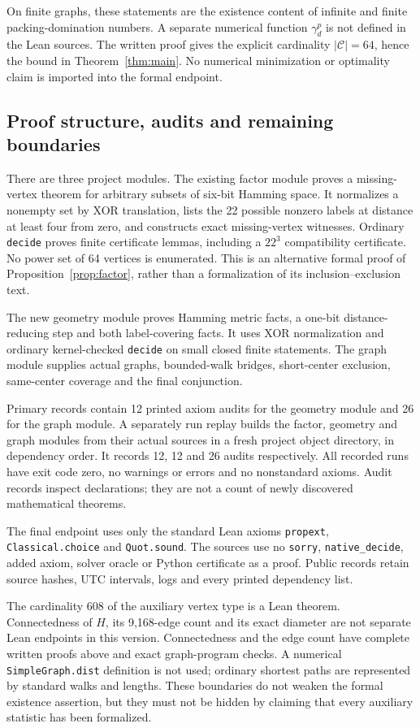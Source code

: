 \documentclass[11pt]{article}
\theoremstyle{definition}
\theoremstyle{remark}
\newcommand{\code}{\mathcal C}
\begin{document}
On finite graphs, these statements are the existence content
of infinite and finite packing-domination numbers. A separate
numerical function \(\gamma_d^p\) is not defined in the Lean
sources. The written proof gives the explicit cardinality
\(|\code|=64\), hence the bound in Theorem~\ref{thm:main}.
No numerical minimization or optimality claim is imported
into the formal endpoint.

\subsection{Proof structure, audits and remaining boundaries}
There are three project modules. The existing factor module
proves a missing-vertex theorem for arbitrary subsets of
six-bit Hamming space. It normalizes a nonempty set by XOR
translation, lists the 22 possible nonzero labels at distance
at least four from zero, and constructs exact missing-vertex
witnesses. Ordinary \texttt{decide} proves finite certificate
lemmas, including a \(22^3\) compatibility certificate.
No power set of 64 vertices is enumerated. This is an
alternative formal proof of Proposition~\ref{prop:factor},
rather than a formalization of its inclusion--exclusion text.

The new geometry module proves Hamming metric facts, a one-bit
distance-reducing step and both label-covering facts. It uses
XOR normalization and ordinary kernel-checked \texttt{decide}
on small closed finite statements. The graph module supplies
actual graphs, bounded-walk bridges, short-center exclusion,
same-center coverage and the final conjunction.

Primary records contain 12 printed axiom audits for the geometry
module and 26 for the graph module. A separately run replay
builds the factor, geometry and graph modules from their actual
sources in a fresh project object directory, in dependency order.
It records 12, 12 and 26 audits respectively. All recorded runs
have exit code zero, no warnings or errors and no nonstandard
axioms. Audit records inspect declarations; they are not a
count of newly discovered mathematical theorems.

The final endpoint uses only the standard Lean axioms
\texttt{propext}, \texttt{Classical.choice} and \texttt{Quot.sound}.
The sources use no \texttt{sorry}, \texttt{native\_decide}, added
axiom, solver oracle or Python certificate as a proof.
Public records retain source hashes, UTC intervals, logs and
every printed dependency list.

The cardinality 608 of the auxiliary vertex type is a Lean
theorem. Connectedness of \(H\), its 9,168-edge count and its
exact diameter are not separate Lean endpoints in this version.
Connectedness and the edge count have complete written proofs
above and exact graph-program checks. A numerical
\texttt{SimpleGraph.dist} definition is not used; ordinary
shortest paths are represented by standard walks and lengths.
These boundaries do not weaken the formal existence assertion,
but they must not be hidden by claiming that every auxiliary
statistic has been formalized.
\end{document}
